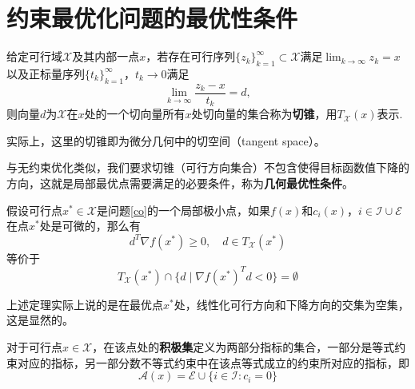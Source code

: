 \section{约束最优化问题的最优性条件}
\begin{definition}
	给定可行域$\mathcal{X}$及其内部一点$x$，若存在可行序列$\{z_k\}_{k=1}^\infty\subset \mathcal{X}$满足$\lim_{k\to \infty}z_k = x$以及正标量序列$\{t_k\}_{k=1}^\infty$，$t_k\to 0$满足
	\begin{equation*}
		\lim\limits_{k\to \infty}\frac{z_k - x}{t_k} = d,
	\end{equation*}
	则向量$d$为$\mathcal{X}$在$x$处的一个切向量所有$x$处切向量的集合称为\textbf{切锥}，用$T_\mathcal{X}(x)$表示.
\end{definition}
\begin{note}
	实际上，这里的切锥即为微分几何中的切空间（tangent space）。
\end{note}
与无约束优化类似，我们要求切锥（可行方向集合）不包含使得目标函数值下降的方向，这就是局部最优点需要满足的必要条件，称为\textbf{几何最优性条件}。
\begin{theorem}[几何最优性条件]
	假设可行点$x^*\in\mathcal{X}$是问题\ref{co}的一个局部极小点，如果$f(x)$和$c_i(x)$，$i\in \mathcal{I}\cup \mathcal{E}$在点$x^*$处是可微的，那么有
	\begin{equation*}
		d^T\nabla f(x^*)\geq 0,\quad d\in T_\mathcal{X}(x^*)
	\end{equation*}
	等价于
	\begin{equation*}
		 T_\mathcal{X}(x^*)\cap \{d\mid \nabla f(x^*)^Td<0\}=\emptyset
	\end{equation*}
\end{theorem}
\begin{note}
	上述定理实际上说的是在最优点$x^*$处，线性化可行方向和下降方向的交集为空集，这是显然的。
\end{note}
\begin{definition}
	对于可行点$x\in \mathcal{X}$，在该点处的\textbf{积极集}定义为两部分指标的集合，一部分是等式约束对应的指标，另一部分数不等式约束中在该点等式成立的约束所对应的指标，即
	\begin{equation*}
		\mathcal{A}(x) = \mathcal{E}\cup \{i\in\mathcal{I}:c_i = 0\}
	\end{equation*}
\end{definition}

